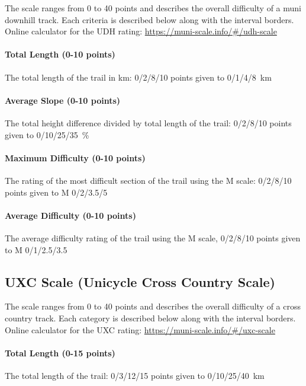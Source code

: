 \documentclass[a4paper,oneside]{scrartcl}
\begin{document}
The scale ranges from 0 to 40 points and describes the overall difficulty of a
muni downhill track. Each criteria is described below along with the
interval borders.\\
Online calculator for the UDH rating: \url{https://muni-scale.info/#/udh-scale}

\paragraph{Total Length (0-10 points)}
\hangindent=1cm
The total length of the trail in km: 0/2/8/10 points given to 0/1/4/8~km

\paragraph{Average Slope (0-10 points)}
\hangindent=1cm
The total height difference divided by total length of the trail: 0/2/8/10
points given to 0/10/25/35~\%

\paragraph{Maximum Difficulty (0-10 points)}
\hangindent=1cm
The rating of the most difficult section of the trail using the M scale:
0/2/8/10 points given to M 0/2/3.5/5

\paragraph{Average Difficulty (0-10 points)}
\hangindent=1cm
The average difficulty rating of the trail using the M scale, 0/2/8/10 points
given to M 0/1/2.5/3.5


\subsection{UXC Scale (Unicycle Cross Country Scale)}
\label{sec:uxc-scale}
The scale ranges from 0 to 40 points and describes the overall difficulty of a
cross country track. Each category is described below along with the
interval borders.\\
Online calculator for the UXC rating: \url{https://muni-scale.info/#/uxc-scale}


\paragraph{Total Length (0-15 points)}
\hangindent=1cm
The total length of the trail: 0/3/12/15 points given to 0/10/25/40~km
\end{document}
